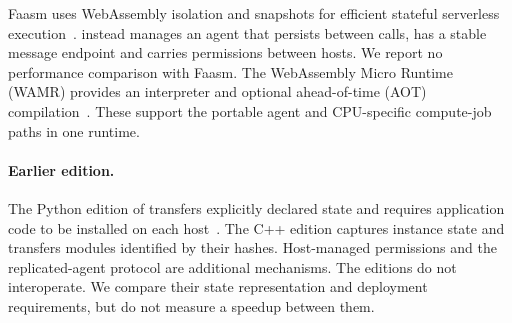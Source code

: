Faasm uses WebAssembly isolation and snapshots for efficient stateful
serverless execution~\cite{shillaker2020faasm}. \paglets{} instead manages
an agent that persists between calls, has a stable message endpoint and
carries permissions between hosts. We report no performance comparison
with Faasm. The WebAssembly Micro Runtime (WAMR) provides an interpreter
and optional ahead-of-time (AOT) compilation~\cite{wamr}. These support
the portable agent and CPU-specific compute-job paths in one runtime.

\paragraph{Earlier edition.}
The Python edition of \paglets{} transfers explicitly declared state
and requires application code to be installed on each
host~\cite{klukas2026pagletsNote}. The C++ edition captures instance state
and transfers modules identified by their hashes. Host-managed
permissions and the replicated-agent protocol are additional mechanisms.
The editions do not interoperate. We compare their state representation
and deployment requirements, but do not measure a speedup between them.
